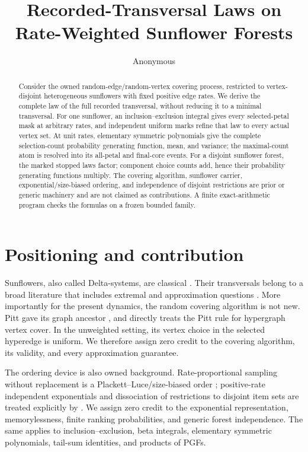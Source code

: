 \documentclass[10pt,a4paper]{amsart}
\title{Recorded-Transversal Laws on Rate-Weighted Sunflower Forests}
\author{Anonymous}
\date{}
\begin{document}
\begin{abstract}
Consider the owned random-edge/random-vertex covering process, restricted to
vertex-disjoint heterogeneous sunflowers with fixed positive edge rates.  We
derive the complete law of the full recorded transversal, without reducing it
to a minimal transversal.  For one sunflower, an inclusion--exclusion integral
gives every selected-petal mask at arbitrary rates, and independent uniform
marks refine that law to every actual vertex set.  At unit rates, elementary
symmetric polynomials give the complete selection-count probability generating
function, mean, and variance; the maximal-count atom is resolved into its
all-petal and final-core events.  For a disjoint sunflower forest, the marked
stopped laws factor; component choice counts add, hence their probability
generating functions multiply.  The covering algorithm,
sunflower carrier, exponential/size-biased ordering, and independence of
disjoint restrictions are prior or generic machinery and are not claimed as
contributions.  A finite exact-arithmetic program checks the formulas on a
frozen bounded family.
\end{abstract}

\maketitle

\section{Positioning and contribution}

Sunflowers, also called Delta-systems, are classical
\citep{erdosrado1960}.  Their transversals belong to a broad literature that
includes extremal and approximation questions \citep{chvatalmcdiarmid1992}.
More importantly for the present dynamics, the random covering algorithm is
not new.  Pitt gave its graph ancestor \citep{pitt1985}, and
\citet[Section~5.1 and Theorem~6]{baryehuda2000} directly treats the Pitt rule
for hypergraph vertex cover.  In the unweighted setting, its vertex choice in
the selected hyperedge is uniform.  We therefore assign zero credit to the
covering algorithm, its validity, and every approximation guarantee.

The ordering device is also owned background.  Rate-proportional sampling
without replacement is a Plackett--Luce/size-biased order
\citep{plackett1975}; positive-rate independent exponentials and dissociation
of restrictions to disjoint item sets are treated explicitly by
\citet{gnedin2026}.  We assign zero credit to the exponential representation,
memorylessness, finite ranking probabilities, and generic forest
independence.  The same applies to inclusion--exclusion, beta integrals,
elementary symmetric polynomials, tail-sum identities, and products of PGFs.
\end{document}
